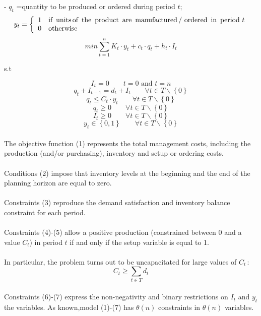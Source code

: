 \documentclass[a4paper,12pt,titlepage]{article}
\begin{document}
	- $q_t$ =quantity to be produced or ordered during period $t$;\\
	$$y_t=
	\bigg \{
	\begin{array}{ll}
	1\quad \text{if \,units\,of\, the\, product\, are\, manufactured\,/ ordered\, in\, period\,}\, t\\
	0\quad \text{otherwise}\\
	\end{array}
	$$
	\begin{equation}
		min \sum_{t=1}^{n}K_t\cdot y_t+c_t\cdot q_t+h_t\cdot I_t
	\end{equation}
	\begin{center}
		s.t
	\end{center}
	\begin{equation}
		I_t =0\qquad t=0\,\, \text{and}\,\, t=n
	\end{equation}
	\begin{equation}
		q_t+I_{t-1}=d_t+I_t\qquad \forall t \in T\backslash\left\lbrace 0 \right\rbrace 
	\end{equation}
	\begin{equation}
		q_t \leq C_t\cdot y_t \qquad \forall t \in T\backslash\left\lbrace 0 \right\rbrace 
	\end{equation}
	\begin{equation}
		q_t\geq 0 \qquad \forall t \in T\backslash\left\lbrace 0 \right\rbrace 
	\end{equation}
	\begin{equation}
		I_t \geq 0 \qquad \forall t \in T\backslash\left\lbrace 0 \right\rbrace 
	\end{equation}
	\begin{equation}
		y_t \in \left\lbrace 0,1\right\rbrace \qquad \forall t \in T\backslash\left\lbrace 0 \right\rbrace 
	\end{equation}
	\\
	The objective function (1) represents the total management costs, including the production
	(and/or purchasing), inventory and setup or ordering costs.\\
	\\
	Conditions (2) impose that inventory levels at the beginning and the end of the planning horizon are equal to zero. \\
	\\
	Constraints (3) reproduce the
	demand satisfaction and inventory balance constraint for each period. \\
	\\
	Constraints (4)-(5) allow a positive production (constrained between $0$ and a value $C_t$) in period $t$ if and only if the setup variable is equal to 1. \\
	\\
	In particular, the problem turns out to be uncapacitated for large values of $C_t$\,:
	\begin{equation*}
		C_t \geq \sum_{t\in T}d_t
	\end{equation*}
	\\
	Constraints (6)-(7) express the non-negativity and binary restrictions on $I_t$ and $y_t$ the variables.
	As known,model (1)-(7) has $\theta (n)$ constraints in $\theta (n)$ variables.
	
\end{document}
